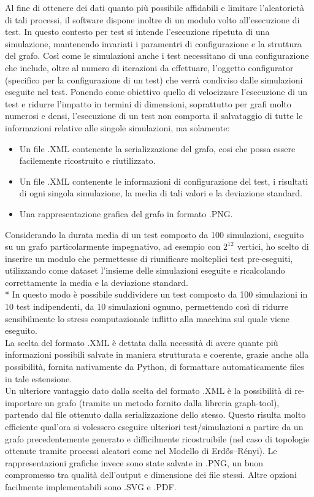 \documentclass{article}
\begin{document}
Al fine di ottenere dei dati quanto più possibile affidabili e limitare l'aleatorietà di tali processi, il software dispone inoltre di un modulo volto all'esecuzione di test. In questo contesto per test si intende l'esecuzione ripetuta di una simulazione, mantenendo invariati i paramentri di configurazione e la struttura del grafo. Così come le simulazioni anche i test necessitano di una configurazione che include, oltre al numero di iterazioni da effettuare, l'oggetto configurator (specifico per la configurazione di un test) che verrà condiviso dalle simulazioni eseguite nel test.
Ponendo come obiettivo quello di velocizzare l'esecuzione di un test e ridurre l'impatto in termini di dimensioni, soprattutto per grafi molto numerosi e densi, l'esecuzione di un test non comporta il salvataggio di tutte le informazioni relative alle singole simulazioni, ma solamente:
\begin{itemize}
\item Un file .XML contenente la serializzazione del grafo, cosi che possa essere facilemente ricostruito e riutilizzato.
\item Un file .XML contenente le informazioni di configurazione del test, i risultati di ogni singola simulazione, la media di tali valori e la deviazione standard.
\item Una rappresentazione grafica del grafo in formato .PNG.
\end{itemize}
Considerando la durata media di un test composto da 100 simulazioni, eseguito su un grafo particolarmente  impegnativo, ad esempio con $2^{12^{\mathrm{}}}$ vertici, ho scelto di inserire un modulo che permettesse di riunificare molteplici test pre-eseguiti, utilizzando come dataset l'insieme delle simulazioni eseguite e ricalcolando correttamente la media e la deviazione standard.\\*
In questo modo è possibile suddividere un test composto da 100 simulazioni in 10 test indipendenti, da 10 simulazioni ognuno, permettendo così di ridurre sensibilmente lo stress computazionale inflitto alla macchina sul quale viene eseguito.\\
La scelta del formato .XML è dettata dalla necessità di avere quante più informazioni possibili salvate in maniera strutturata e coerente, grazie anche alla possibilità, fornita nativamente da Python, di formattare automaticamente files in tale estensione.\\
Un ulteriore vantaggio dato dalla scelta del formato .XML è la possibilità di re-importare un grafo (tramite un metodo fornito dalla libreria graph-tool), partendo dal file ottenuto dalla serializzazione dello stesso. Questo risulta molto efficiente qual'ora si volessero eseguire ulteriori test/simulazioni a partire da un grafo precedentemente generato e difficilmente ricostruibile (nel caso di topologie ottenute tramite processi aleatori come nel Modello di Erdős–Rényi).
Le rappresentazioni grafiche invece sono state salvate in .PNG, un buon compromesso tra qualità dell'output e dimensione dei file stessi. Altre opzioni facilmente implementabili sono .SVG e .PDF.
\end{document}
